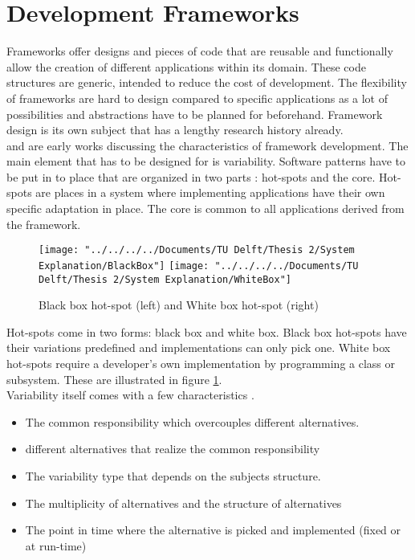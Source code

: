 

\section{Development Frameworks}

Frameworks offer designs and pieces of code that are reusable and functionally allow the creation of different applications within its domain. These code structures are generic, intended to reduce the cost of development. The flexibility of frameworks are hard to design compared to specific applications as a lot of possibilities and abstractions have to be planned for beforehand. Framework design is its own subject that has a lengthy research history already. \\

\cite{schmid1997systematic} and \cite{roberts1996evolving} are early works discussing the characteristics of framework development. The main element that has to be designed for is variability. Software patterns have to be put in to place that are organized in two parts \citep{ben2004uml}: hot-spots and the core. Hot-spots are places in a system where implementing applications have their own specific adaptation in place. The core is common to all applications derived from the framework. \\

\begin{figure}
	\centering
	\texttt{[image: "../../../../Documents/TU Delft/Thesis 2/System Explanation/BlackBox"]}
	\texttt{[image: "../../../../Documents/TU Delft/Thesis 2/System Explanation/WhiteBox"]}	\caption[Black White Box Hot Spot]{Black box hot-spot (left) and White box hot-spot (right)}
	\label{fig:blackbox}
\end{figure}

Hot-spots come in two forms: black box and white box. Black box hot-spots have their variations predefined and implementations can only pick one. White box hot-spots require a developer's own implementation by programming a class or subsystem. These are illustrated in figure \ref{fig:blackbox}.\\

Variability itself comes with a few characteristics \citep{schmid1997systematic}. 
\begin{itemize}
	\item The common responsibility which overcouples different alternatives.
	\item different alternatives that realize the common responsibility
	\item The variability type that depends on the subjects structure.
	\item The multiplicity of alternatives and the structure of alternatives
	\item The point in time where the alternative is picked and implemented (fixed or at run-time)
\end{itemize}

